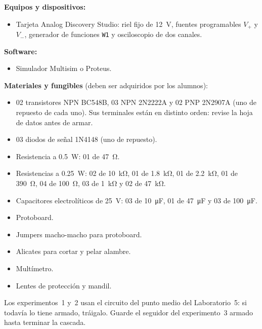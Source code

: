 \documentclass[11pt,a4paper]{article}
\let\needspace\Needspace
\begin{document}
\vspace{0.25cm}
\noindent\textbf{Equipos y dispositivos:}
\begin{itemize}
    \item Tarjeta Analog Discovery Studio: riel fijo de \qty{+12}{\volt}, fuentes programables
          $V_+$ y $V_-$, generador de funciones \texttt{W1} y osciloscopio de dos canales.
\end{itemize}

\noindent\textbf{Software:}
\begin{itemize}
    \item Simulador Multisim o Proteus.
\end{itemize}

\vspace{0.25cm}
\needspace{6\baselineskip}
\noindent\textbf{Materiales y fungibles} (deben ser adquiridos por los alumnos):
\begin{itemize}
    \item 02 transistores NPN BC548B, 03 NPN 2N2222A y 02 PNP 2N2907A (uno de repuesto de cada
          uno). Sus terminales están en distinto orden: revise la hoja de datos antes de armar.
    \item 03 diodos de señal 1N4148 (uno de repuesto).
    \item Resistencia a \qty{0.5}{\watt}: 01 de \qty{47}{\ohm}.
    \item Resistencias a \qty{0.25}{\watt}:
          02 de \qty{10}{\kilo\ohm},
          01 de \qty{1.8}{\kilo\ohm},
          01 de \qty{2.2}{\kilo\ohm},
          01 de \qty{390}{\ohm},
          04 de \qty{100}{\ohm},
          03 de \qty{1}{\kilo\ohm} y
          02 de \qty{47}{\kilo\ohm}.
    \item Capacitores electrolíticos de \qty{25}{\volt}: 03 de \qty{10}{\micro\farad},
          01 de \qty{47}{\micro\farad} y 03 de \qty{100}{\micro\farad}.
    \item Protoboard.
    \item Jumpers macho-macho para protoboard.
    \item Alicates para cortar y pelar alambre.
    \item Multímetro.
    \item Lentes de protección y mandil.
\end{itemize}

\noindent Los experimentos~1 y~2 usan el circuito del punto medio del Laboratorio~5: si todavía
lo tiene armado, tráigalo. Guarde el seguidor del experimento~3 armado hasta terminar la
cascada.
\end{document}
